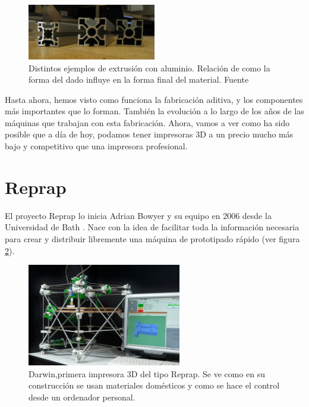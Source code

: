 \begin{itemize}
        \begin{figure}[H]
                \centering
                \includegraphics[width=0.5\textwidth]{images/Extruded_aluminium_section.jpg}
                \caption[Distintos ejemplos de extrusión.]{Distintos ejemplos de extrusión con aluminio. Relación de como la forma del dado influye en la forma final del material. Fuente \cite{ejemplosextrusion}}
                \label{fig:estado_ejemplos}
        \end{figure}

\end{itemize}

Hasta ahora, hemos visto como funciona la fabricación aditiva, y los componentes más importantes que lo forman. También la evolución a lo largo de los años de las máquinas que trabajan con esta fabricación. Ahora, vamos a ver como ha sido posible que a día de hoy, podamos tener impresoras 3D a un precio mucho más bajo y competitivo que una impresora profesional.\\

\section{Reprap}
El proyecto Reprap lo inicia Adrian Bowyer y su equipo en 2006 desde la Universidad de Bath \cite{jones2011reprap}. Nace con la idea de facilitar toda la información necesaria para crear y distribuir libremente una máquina de prototipado rápido (ver figura \ref{fig:estado_darwin}).

\begin{figure}[H]
    \centering
    \includegraphics[width=0.6\textwidth]{images/darwin.jpg}
    \caption[Darwin,primera impresora 3D del tipo Reprap]{Darwin,primera impresora 3D del tipo Reprap. Se ve como en su construcción se usan materiales domésticos y como se hace el control desde un ordenador personal.}
    \label{fig:estado_darwin}
\end{figure}


